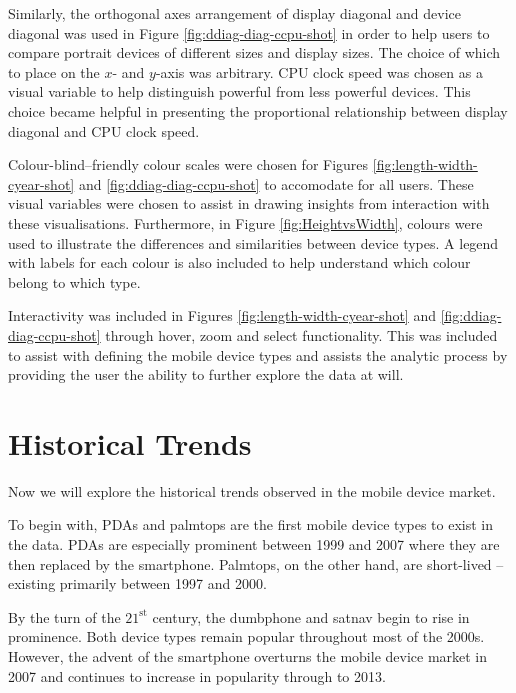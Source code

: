\documentclass[conference]{IEEEtran}
\begin{document}
Similarly, the orthogonal axes arrangement of display diagonal and device
diagonal was used in Figure \ref{fig:ddiag-diag-ccpu-shot} in order to help
users to compare portrait devices of different sizes and display sizes. The
choice of which to place on the $x$- and $y$-axis was arbitrary. CPU clock
speed was chosen as a visual variable to help distinguish powerful from less
powerful devices. This choice became helpful in presenting the proportional
relationship between display diagonal and CPU clock speed.

Colour-blind--friendly colour scales were chosen for Figures
\ref{fig:length-width-cyear-shot} and \ref{fig:ddiag-diag-ccpu-shot} to
accomodate for all users. These visual variables were chosen to assist in
drawing insights from interaction with these visualisations. Furthermore,
in Figure \ref{fig:HeightvsWidth}, colours were used to illustrate the
differences and similarities between device types. A legend with labels for
each colour is also included to help understand which colour belong to which
type.

Interactivity was included in Figures \ref{fig:length-width-cyear-shot} and
\ref{fig:ddiag-diag-ccpu-shot} through hover, zoom and select
functionality. This was included to assist with defining the mobile device
types and assists the analytic process by providing the user the ability to
further explore the data at will.

\section{Historical Trends}

Now we will explore the historical trends observed in the mobile device market.

To begin with, PDAs and palmtops are the first mobile device types to exist in
the data. PDAs are especially prominent between
1999 and 2007 where they are then replaced by the smartphone. Palmtops, on the
other hand, are short-lived -- existing primarily between 1997 and 2000.

By the turn of the $21^{\text{st}}$ century, the dumbphone and satnav begin
to rise in prominence. Both device types remain popular throughout most of the
2000s. However, the advent of the smartphone overturns the mobile device market
in 2007 and continues to increase in popularity through to 2013.
\end{document}
